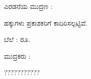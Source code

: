 \thispagestyle{empty}


\vfill

{
\begin{center}

ಎರಡನೆಯ ಮುದ್ರಣ : 

\vfill

ಹಕ್ಕುಗಳು ಪ್ರಕಾಶಕರಿಗೆ ಕಾದಿರಿಸಲ್ಪಟ್ಟಿವೆ. 

\vfill

ಬೆಲೆ : ರೂ. 

\vfill

ಮುದ್ರಕರು :

???????????

\end{center}

}
